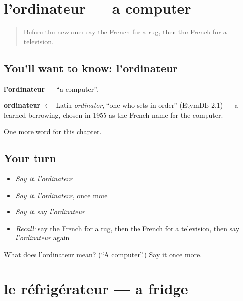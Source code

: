 \section[l'ordinateur]{l'ordinateur — a computer}

\label{lesson:FR-C111-ordinateur}



\begin{quote}
Before the new one: say the French for a rug, then the French for a television.
\end{quote}

\subsection*{You'll want to know: l'ordinateur}
\textbf{l'ordinateur} — \textquotedblleft{}a computer\textquotedblright{}.

\begin{cousinweb}
\textbf{ordinateur} $\leftarrow$ Latin \emph{ordinator}, \textquotedblleft{}one who sets in order\textquotedblright{} (EtymDB 2.1) — a learned borrowing, chosen in 1955 as the French name for the computer.
\end{cousinweb}

\begin{grammarlens}[title={What you've built}]
One more word for this chapter.
\end{grammarlens}

\subsection*{Your turn}
\begin{itemize}
\raggedright
  \item \emph{Say it:} \emph{l'ordinateur}
  \item \emph{Say it:} \emph{l'ordinateur}, once more
  \item \emph{Say it:} say \emph{l'ordinateur}
  \item \emph{Recall:} say the French for a rug, then the French for a television, then say \emph{l'ordinateur} again
\end{itemize}

\begin{tcolorbox}[breakable,colback=teal!4,colframe=teal!35!black,title={Before you move on}]
What does l'ordinateur mean? (\textquotedblleft{}A computer\textquotedblright{}.) Say it once more.
\end{tcolorbox}
\section[le réfrigérateur]{le réfrigérateur — a fridge}


